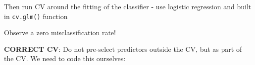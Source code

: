 \documentclass[]{article}
\newenvironment{Shaded}{\begin{snugshade}}{\end{snugshade}}
\newcommand{\ControlFlowTok}[1]{\textcolor[rgb]{0.13,0.29,0.53}{\textbf{#1}}}
\newcommand{\DataTypeTok}[1]{\textcolor[rgb]{0.13,0.29,0.53}{#1}}
\newcommand{\DecValTok}[1]{\textcolor[rgb]{0.00,0.00,0.81}{#1}}
\newcommand{\FloatTok}[1]{\textcolor[rgb]{0.00,0.00,0.81}{#1}}
\newcommand{\KeywordTok}[1]{\textcolor[rgb]{0.13,0.29,0.53}{\textbf{#1}}}
\newcommand{\NormalTok}[1]{#1}
\newcommand{\OperatorTok}[1]{\textcolor[rgb]{0.81,0.36,0.00}{\textbf{#1}}}
\newcommand{\StringTok}[1]{\textcolor[rgb]{0.31,0.60,0.02}{#1}}
\begin{document}
Then run CV around the fitting of the classifier - use logistic
regression and built in \texttt{cv.glm()} function

\begin{Shaded}
\end{Shaded}

Observe a zero misclassification rate!

\textbf{CORRECT CV}: Do not pre-select predictors outside the CV, but as
part of the CV. We need to code this ourselves:
\end{document}
